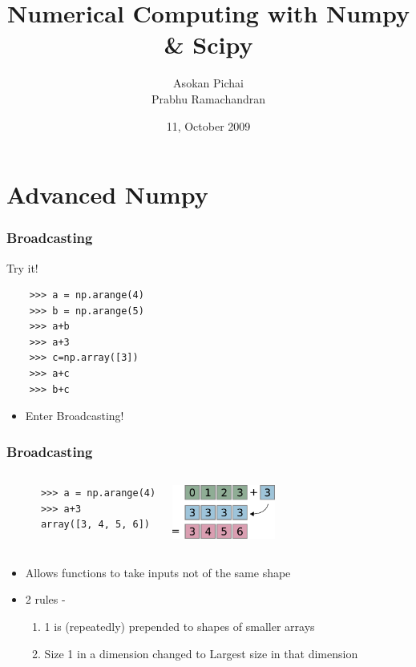 \documentclass[14pt,compress]{beamer}
\title[]{Numerical Computing with Numpy \& Scipy}
\author[FOSSEE Team] {Asokan Pichai\\Prabhu Ramachandran}
\institute[IIT Bombay] {Department of Aerospace Engineering\\IIT Bombay}
\date[] {11, October 2009}
\begin{document}
\begin{frame}
  \maketitle
\end{frame}

\section{Advanced Numpy}
\begin{frame}[fragile]
  \frametitle{Broadcasting}
  Try it!
  \begin{lstlisting}
    >>> a = np.arange(4)
    >>> b = np.arange(5)
    >>> a+b
    >>> a+3
    >>> c=np.array([3])
    >>> a+c
    >>> b+c
  \end{lstlisting}
  \begin{itemize}
    \item Enter Broadcasting!
  \end{itemize}
\end{frame}

\begin{frame}[fragile]
  \frametitle{Broadcasting}
  \begin{columns}
    \hspace*{-1.5in}
    \begin{lstlisting}
      >>> a = np.arange(4)
      >>> a+3
      array([3, 4, 5, 6])
    \end{lstlisting}
    \includegraphics[height=0.7in, interpolate=true]{data/broadcast_scalar}
  \end{columns}
  \begin{itemize}
    \item Allows functions to take inputs not of the same shape
    \item 2 rules -
      \begin{enumerate}
      \item 1 is (repeatedly) prepended to shapes of smaller arrays
      \item Size 1 in a dimension changed to Largest size in that dimension
      \end{enumerate}
  \end{itemize}
\end{frame}
\end{document}
